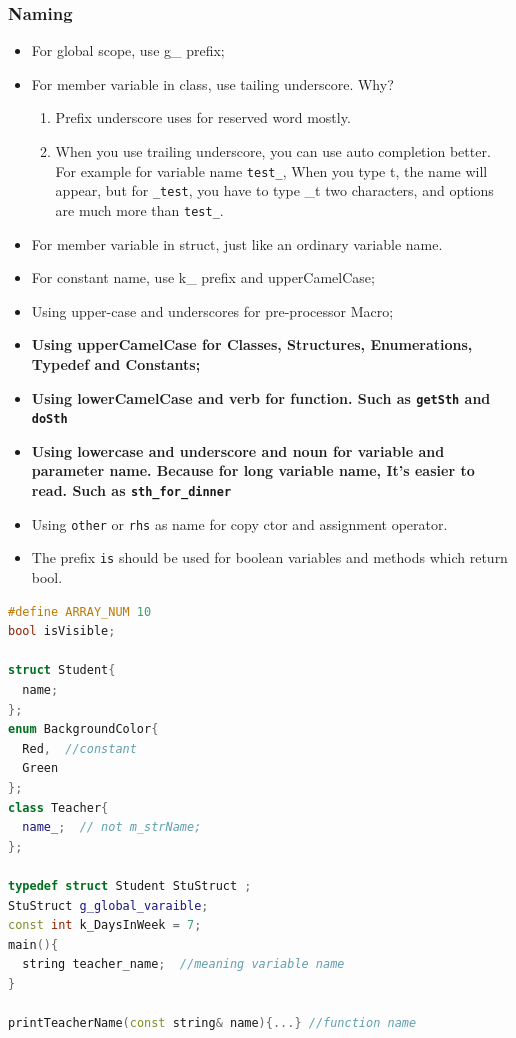 \documentclass[a4paper,12pt,twoside]{book}
\begin{document}
\subsubsection{Naming}
\begin{itemize}

\item For global scope, use g\_ prefix;

\item For member variable in class, use tailing underscore. Why? 
\begin{enumerate}
\item Prefix underscore uses for reserved word mostly.
\item When you use trailing underscore, you can use auto completion better. For example for variable name \texttt{test\_}, When you type t, the name will appear, but for \texttt{\_test}, you have to type \_t two characters, and options are much more than \texttt{test\_}.
\end{enumerate}

\item For member variable in struct, just like an ordinary variable name. 

\item For constant name, use k\_ prefix and upperCamelCase;

\item Using upper-case and underscores for pre-processor Macro;

\item \textbf{Using upperCamelCase for Classes, Structures, Enumerations, Typedef and  Constants;}

\item \textbf{Using lowerCamelCase and verb for function. Such as \texttt{getSth} and \texttt{doSth}}

\item \textbf{Using lowercase and underscore  and noun for variable and parameter name. Because for long variable name, It's easier to read. Such as \texttt{sth\_for\_dinner}}

\item Using \texttt{other} or \texttt{rhs} as name for copy ctor and assignment operator.

\item The prefix \texttt{is} should be used for boolean variables and methods which return bool.

\end{itemize}

\begin{lstlisting}[frame=single, language=c++]
#define ARRAY_NUM 10
bool isVisible;

struct Student{
  name;
};
enum BackgroundColor{
  Red,  //constant
  Green
};
class Teacher{
  name_;  // not m_strName;  
};

typedef struct Student StuStruct ;
StuStruct g_global_varaible;
const int k_DaysInWeek = 7;
main(){
  string teacher_name;  //meaning variable name
}

printTeacherName(const string& name){...} //function name
\end{lstlisting}
\end{document}
